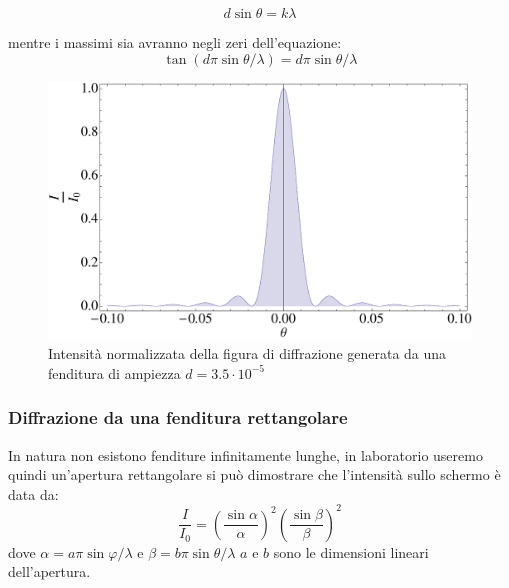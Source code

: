 \documentclass[a4paper,10pt,oneside]{article}
\begin{document}
\begin{equation}
 d\sin\theta=k\lambda
\end{equation}

mentre i massimi sia avranno negli zeri dell'equazione:
\begin{equation}
 \tan(d\pi\sin\theta/\lambda)=d\pi\sin\theta/\lambda
\end{equation}

\begin{figure}[H]
 \centering
 \includegraphics[width=\textwidth]{./Immagini/diffrazione2.pdf}
 \caption{Intensità normalizzata della figura di diffrazione generata da una fenditura di ampiezza $d=3.5\cdot 10^{-5}$}
 \label{fig:diffrazione_slit}
\end{figure}

\subsubsection{Diffrazione da una fenditura rettangolare}
In natura non esistono fenditure infinitamente lunghe, in laboratorio useremo quindi un'apertura rettangolare si può dimostrare che l'intensità sullo schermo è data da:
\begin{equation}
 \frac{I}{I_0}=\left(\frac{\sin\alpha}{\alpha}\right)^2\left(\frac{\sin\beta}{\beta}\right)^2
\end{equation}
dove $\alpha=a\pi\sin\varphi/\lambda$ e $\beta=b\pi\sin\theta/\lambda$ $a$ e $b$ sono le dimensioni lineari dell'apertura.
\end{document}
